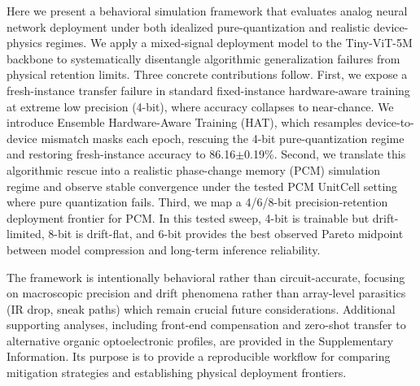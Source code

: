 Here we present a behavioral simulation framework that evaluates analog neural network deployment under both idealized pure-quantization and realistic device-physics regimes. We apply a mixed-signal deployment model to the Tiny-ViT-5M backbone to systematically disentangle algorithmic generalization failures from physical retention limits. Three concrete contributions follow. First, we expose a fresh-instance transfer failure in standard fixed-instance hardware-aware training at extreme low precision (4-bit), where accuracy collapses to near-chance. We introduce Ensemble Hardware-Aware Training (HAT), which resamples device-to-device mismatch masks each epoch, rescuing the 4-bit pure-quantization regime and restoring fresh-instance accuracy to 86.16$\pm$0.19\%. Second, we translate this algorithmic rescue into a realistic phase-change memory (PCM) simulation regime and observe stable convergence under the tested PCM UnitCell setting where pure quantization fails. Third, we map a 4/6/8-bit precision-retention deployment frontier for PCM. In this tested sweep, 4-bit is trainable but drift-limited, 8-bit is drift-flat, and 6-bit provides the best observed Pareto midpoint between model compression and long-term inference reliability.

The framework is intentionally behavioral rather than circuit-accurate, focusing on macroscopic precision and drift phenomena rather than array-level parasitics (IR drop, sneak paths) which remain crucial future considerations. Additional supporting analyses, including front-end compensation and zero-shot transfer to alternative organic optoelectronic profiles, are provided in the Supplementary Information. Its purpose is to provide a reproducible workflow for comparing mitigation strategies and establishing physical deployment frontiers.
